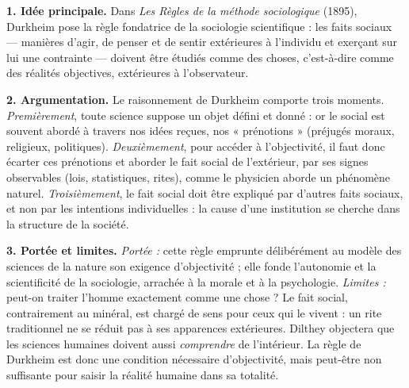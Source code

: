 \documentclass[11pt]{article}
\begin{document}
\begin{corrige}
\textbf{1. Idée principale.} Dans \emph{Les Règles de la méthode sociologique} (1895), Durkheim pose la règle fondatrice de la sociologie scientifique : les faits sociaux — manières d'agir, de penser et de sentir extérieures à l'individu et exerçant sur lui une contrainte — doivent être étudiés comme des choses, c'est-à-dire comme des réalités objectives, extérieures à l'observateur.

\textbf{2. Argumentation.} Le raisonnement de Durkheim comporte trois moments. \emph{Premièrement}, toute science suppose un objet défini et donné : or le social est souvent abordé à travers nos idées reçues, nos « prénotions » (préjugés moraux, religieux, politiques). \emph{Deuxièmement}, pour accéder à l'objectivité, il faut donc écarter ces prénotions et aborder le fait social de l'extérieur, par ses signes observables (lois, statistiques, rites), comme le physicien aborde un phénomène naturel. \emph{Troisièmement}, le fait social doit être expliqué par d'autres faits sociaux, et non par les intentions individuelles : la cause d'une institution se cherche dans la structure de la société.

\textbf{3. Portée et limites.} \emph{Portée :} cette règle emprunte délibérément au modèle des sciences de la nature son exigence d'objectivité ; elle fonde l'autonomie et la scientificité de la sociologie, arrachée à la morale et à la psychologie. \emph{Limites :} peut-on traiter l'homme exactement comme une chose ? Le fait social, contrairement au minéral, est chargé de sens pour ceux qui le vivent : un rite traditionnel ne se réduit pas à ses apparences extérieures. Dilthey objectera que les sciences humaines doivent aussi \emph{comprendre} de l'intérieur. La règle de Durkheim est donc une condition nécessaire d'objectivité, mais peut-être non suffisante pour saisir la réalité humaine dans sa totalité.
\end{corrige}
\end{document}

